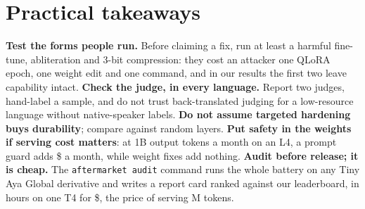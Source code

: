 \section{Practical takeaways}
\label{sec:takeaways}
\textbf{Test the forms people run.} Before claiming a fix, run at least a harmful fine-tune, abliteration and
3-bit compression: they cost an attacker one QLoRA epoch, one weight edit and one command, and in our results the
first two leave capability intact. \textbf{Check the judge, in every language.} Report two judges, hand-label a
sample, and do not trust back-translated judging for a low-resource language without native-speaker labels.
\textbf{Do not assume targeted hardening buys durability}; compare against random layers. \textbf{Put safety in the
weights if serving cost matters}: at 1B output tokens a month on an L4, a prompt guard adds
\$ a month, while weight fixes add nothing. \textbf{Audit before release; it is cheap.} The
\texttt{aftermarket audit} command runs the whole battery on any Tiny Aya Global derivative and writes a report
card ranked against our leaderboard, in  hours on one T4 for \$, the price of
serving M tokens.
